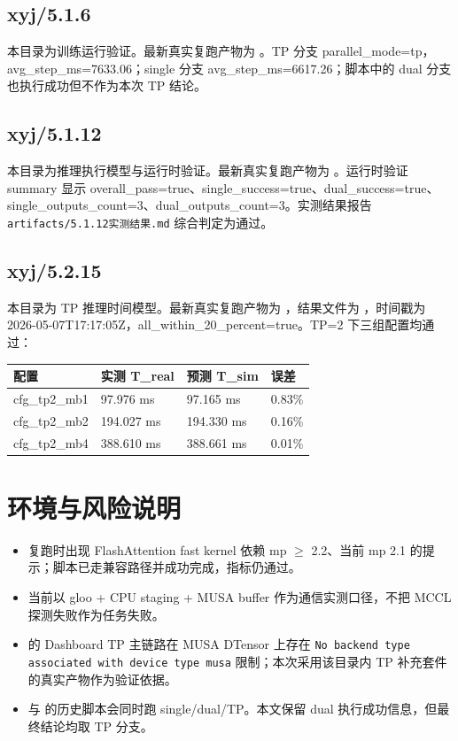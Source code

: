 \documentclass[UTF8,a4paper,11pt]{ctexart}
\begin{document}
\subsection{xyj/5.1.6}

本目录为训练运行验证。最新真实复跑产物为 。TP 分支 parallel\_mode=tp，avg\_step\_ms=7633.06；single 分支 avg\_step\_ms=6617.26；脚本中的 dual 分支也执行成功但不作为本次 TP 结论。

\subsection{xyj/5.1.12}

本目录为推理执行模型与运行时验证。最新真实复跑产物为 。运行时验证 summary 显示 overall\_pass=true、single\_success=true、dual\_success=true、single\_outputs\_count=3、dual\_outputs\_count=3。实测结果报告 \texttt{artifacts/5.1.12实测结果.md} 综合判定为通过。

\subsection{xyj/5.2.15}

本目录为 TP 推理时间模型。最新真实复跑产物为 ，结果文件为 ，时间戳为 2026-05-07T17:17:05Z，all\_within\_20\_percent=true。TP=2 下三组配置均通过：

\begin{center}
\begin{tabular}{L{3.0cm} L{3.0cm} L{3.0cm} L{2.5cm}}
\toprule
配置 & 实测 T\_real & 预测 T\_sim & 误差 \\
\midrule
cfg\_tp2\_mb1 & 97.976 ms & 97.165 ms & 0.83\% \\
cfg\_tp2\_mb2 & 194.027 ms & 194.330 ms & 0.16\% \\
cfg\_tp2\_mb4 & 388.610 ms & 388.661 ms & 0.01\% \\
\bottomrule
\end{tabular}
\end{center}

\section{环境与风险说明}

\begin{itemize}
  \item {} 复跑时出现 FlashAttention fast kernel 依赖 mp $\ge$ 2.2、当前 mp 2.1 的提示；脚本已走兼容路径并成功完成，指标仍通过。
  \item {} 当前以 gloo + CPU staging + MUSA buffer 作为通信实测口径，不把 MCCL 探测失败作为任务失败。
  \item {} 的 Dashboard TP 主链路在 MUSA DTensor 上存在 \texttt{No backend type associated with device type musa} 限制；本次采用该目录内 TP 补充套件的真实产物作为验证依据。
  \item {} 与  的历史脚本会同时跑 single/dual/TP。本文保留 dual 执行成功信息，但最终结论均取 TP 分支。
\end{itemize}
\end{document}
